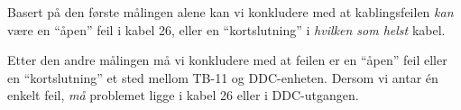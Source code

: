 







Basert på den første målingen alene kan vi konkludere med at kablingsfeilen {\it kan} være en ``åpen'' feil i kabel 26, eller en ``kortslutning'' i {\it hvilken som helst} kabel.

\vskip 10pt

Etter den andre målingen må vi konkludere med at feilen er en ``åpen'' feil eller en ``kortslutning'' et sted mellom TB-11 og DDC-enheten. Dersom vi antar én enkelt feil, {\it må} problemet ligge i kabel 26 eller i DDC-utgangen.


